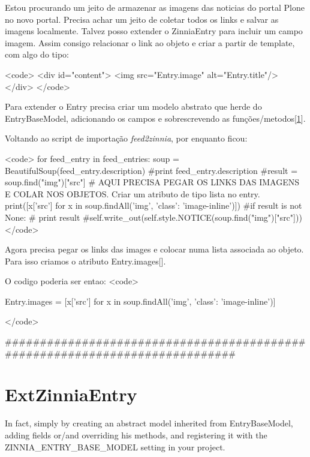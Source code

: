 Estou procurando um jeito de armazenar as imagens das noticias do
portal Plone no novo portal. Precisa achar um jeito de coletar todos
os links e salvar as imagens localmente. Talvez posso extender o
ZinniaEntry para incluir um campo imagem. Assim consigo relacionar o
link ao objeto e criar a partir de template, com algo do tipo:

<code>
	<div id="content">
	     <img src="{Entry.image}" alt="{Entry.title}"/>
	     </div>
</code>

Para extender o Entry precisa criar um modelo abstrato que herde do
EntryBaseModel, adicionando os campos e sobrescrevendo as
funções/metodos[\ref{ExtZinniaEntry}]. 

Voltando ao script de importação \emph{feed2zinnia}, por enquanto ficou:

<code>
	for feed_entry in feed_entries:
	    soup = BeautifulSoup(feed_entry.description)
            #print feed_entry.description                                                                                                                  
            #result = soup.find("img")["src"]
	    # AQUI PRECISA PEGAR OS LINKS DAS IMAGENS E COLAR NOS OBJETOS. Criar um atributo de tipo lista no entry.                                                                                                               
            print([x['src'] for x in soup.findAll('img', {'class': 'image-inline'})])
                #if result is not None:                                                                                                                                       #    print result                                                                                                                                             #self.write_out(self.style.NOTICE(soup.find("img")["src"]))               
</code>

Agora precisa pegar os links das images e colocar numa lista associada
ao objeto. Para isso criamos o atributo Entry.images[].

O codigo poderia ser entao:
<code>

	Entry.images = [x['src'] for x in soup.findAll('img', {'class': 'image-inline'})]

</code>




############################################################################

\chapter{ExtZinniaEntry}\label{ExtZinniaEntry}
In fact, simply by creating an abstract model inherited from
EntryBaseModel, adding fields or/and overriding his methods, and
registering it with the ZINNIA_ENTRY_BASE_MODEL setting in your
project.

